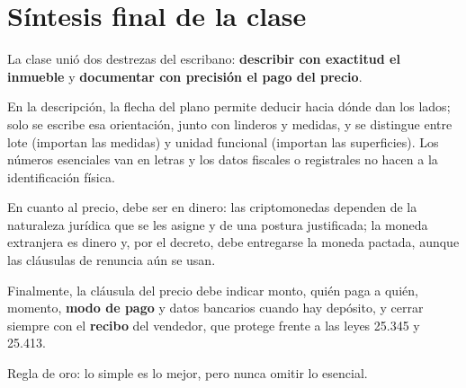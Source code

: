 \documentclass[12pt,oneside]{book}
\begin{document}
\chapter[Síntesis final]{Síntesis final de la clase}

La clase unió dos destrezas del escribano: \textbf{describir con exactitud el inmueble} y \textbf{documentar con precisión el pago del precio}.

En la descripción, la flecha del plano permite deducir hacia dónde dan los lados; solo se escribe esa orientación, junto con linderos y medidas, y se distingue entre lote (importan las medidas) y unidad funcional (importan las superficies). Los números esenciales van en letras y los datos fiscales o registrales no hacen a la identificación física.

En cuanto al precio, debe ser en dinero: las criptomonedas dependen de la naturaleza jurídica que se les asigne y de una postura justificada; la moneda extranjera es dinero y, por el decreto, debe entregarse la moneda pactada, aunque las cláusulas de renuncia aún se usan.

Finalmente, la cláusula del precio debe indicar monto, quién paga a quién, momento, \textbf{modo de pago} y datos bancarios cuando hay depósito, y cerrar siempre con el \textbf{recibo} del vendedor, que protege frente a las leyes 25.345 y 25.413.

\begin{important}
Regla de oro: lo simple es lo mejor, pero nunca omitir lo esencial.
\end{important}
\end{document}

